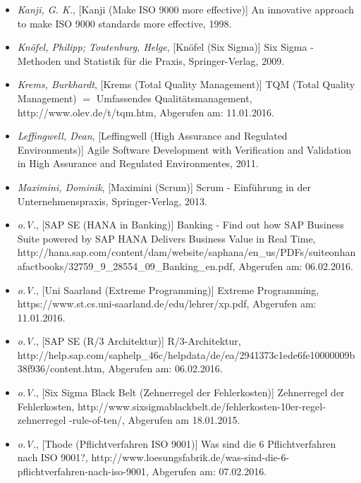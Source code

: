 \begin{itemize}
    \item[] \emph{Kanji, G. K.}, [Kanji (Make ISO 9000 more effective)] An innovative approach to make ISO 9000 standards more effective, 1998.

    \item[] \emph{Knöfel, Philipp; Toutenburg, Helge}, [Knöfel (Six Sigma)] Six Sigma - Methoden und Statistik für die Praxis, Springer-Verlag, 2009.

    \item[] \emph{Krems, Burkhardt}, [Krems (Total Quality Management)] TQM (Total Quality Management) $=$ Umfassendes Qualitätsmanagement, http://www.olev.de/t/tqm.htm, Abgerufen am: 11.01.2016.

    \item[] \emph{Leffingwell, Dean}, [Leffingwell (High Assurance and Regulated Environments)] Agile Software Development with Verification and Validation in High Assurance and Regulated Environmentes, 2011.

    \item[] \emph{Maximini, Dominik}, [Maximini (Scrum)] Scrum - Einführung in der Unternehmenspraxis, Springer-Verlag, 2013.

    \item[] \emph{o.V.}, [SAP SE (HANA in Banking)] Banking - Find out how SAP Business Suite powered by SAP HANA Delivers Business Value in Real Time, http://hana.sap.com/content/dam/website/saphana/en\_us/PDFs/suiteonhanafactbooks/32759\_9\_28554\_09\_Banking\_en.pdf, Abgerufen am: 06.02.2016.

    \item[] \emph{o.V.}, [Uni Saarland (Extreme Programming)] Extreme Programming, https://www.st.cs.uni-saarland.de/edu/lehrer/xp.pdf, Abgerufen am: 11.01.2016.

    \item[] \emph{o.V.}, [SAP SE (R/3 Architektur)] R/3-Architektur, http://help.sap.com/saphelp\_46c/helpdata/de/ea/2941373c1ede6fe10000009b38f936/content.htm, Abgerufen am: 06.02.2016.

    \item[] \emph{o.V.}, [Six Sigma Black Belt (Zehnerregel der Fehlerkosten)] Zehnerregel der Fehlerkosten, http://www.sixsigmablackbelt.de/fehlerkosten-10er-regel-zehnerregel
        -rule-of-ten/, Abgerufen am 18.01.2015.

    \item[] \emph{o.V.}, [Thode (Pflichtverfahren ISO 9001)] Was sind die 6 Pflichtverfahren nach ISO 9001?, http://www.loesungsfabrik.de/was-sind-die-6-pflichtverfahren-nach-iso-9001, Abgerufen am: 07.02.2016.


\end{itemize}
